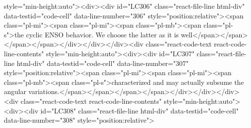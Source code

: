 {{{{style="min-height:auto"><div><div id="LC306" class="react-file-line html-div" data-testid="code-cell" data-line-number="306" style="position:relative"><span class="pl-mi"><span class="pl-mi"><span class="pl-mb"><span class="pl-s">the cyclic ENSO behavior. We choose the latter as it is well</span></span></span></span></div></div></div><div class="react-code-text react-code-line-contents" style="min-height:auto"><div><div id="LC307" class="react-file-line html-div" data-testid="code-cell" data-line-number="307" style="position:relative"><span class="pl-mi"><span class="pl-mi"><span class="pl-mb"><span class="pl-s">characterized and may actually subsume the angular variations.</span></span></span></span></div></div></div><div class="react-code-text react-code-line-contents" style="min-height:auto"><div><div id="LC308" class="react-file-line html-div" data-testid="code-cell" data-line-number="308" style="position:relative">
}}}}
